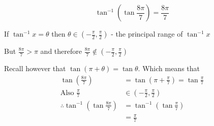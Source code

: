 \documentclass[14pt,fleqn]{extarticle}
\newcommand\angb{\frac{8\pi}{7}}
\newcommand\prng{ \left(-\frac\pi{2},\frac\pi{2} \right)}
\newcommand\angc{\frac\pi{7}}
\begin{document}
 
\begin{snippet}
    \incorrect

\[ \tan^{-1} \left(\tan\angb \right) = \angb \]		
		    
    \reason
    
    If $\tan^{-1}x = \theta$ then $\theta\in\prng$ - the principal range of $\tan^{-1} x$ \newline 
    
    But $\angb > \pi$ and therefore $\angb\notin\prng$ \newline 
    
    Recall however that $\tan \left(\pi+\theta \right)=\tan\theta$. Which means 
    that 
    \begin{align}
	\tan \left(\angb \right) &= \tan \left(\pi + \angc \right) = \tan\angc \\
	\text{Also }\angc&\in \prng \\
	\therefore \tan^{-1} \left(\tan\angb \right) &= \tan^{-1} \left(\tan\angc \right) \\
	&= \angc 
\end{align}
    
\end{snippet} 
\end{document}
